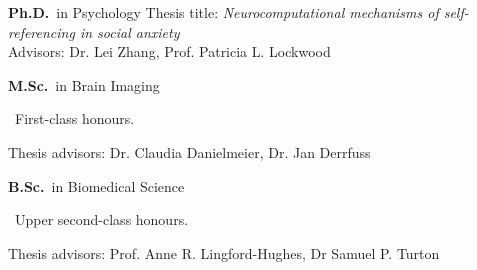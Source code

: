 
	{%
		\textbf{Ph.D.}~in Psychology}
	{%
	Thesis title: \emph{Neurocomputational mechanisms of self-referencing in social anxiety} \\
	Advisors: Dr. Lei Zhang, Prof. Patricia L. Lockwood}

		{%
			\textbf{M.Sc.}~in Brain Imaging \begin{footnotesize}
			~First-class honours.
		\end{footnotesize}}
		{Thesis advisors: Dr. Claudia Danielmeier, Dr. Jan Derrfuss}

{%
	\textbf{B.Sc.}~in Biomedical Science \begin{footnotesize}
	~Upper second-class honours.
\end{footnotesize}}{Thesis advisors: Prof. Anne R. Lingford-Hughes, Dr Samuel P. Turton}
